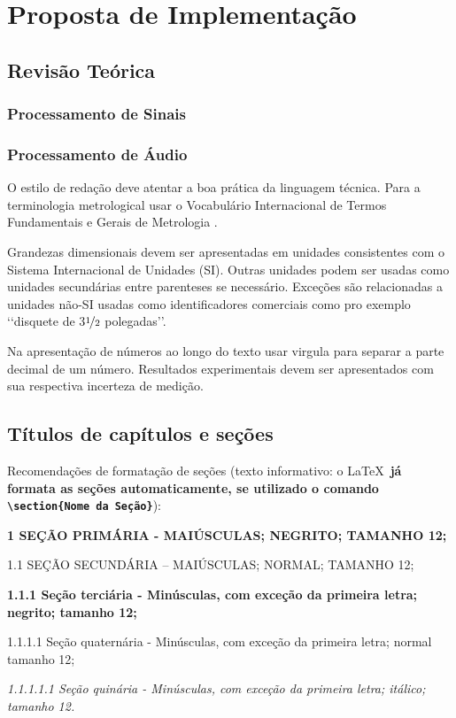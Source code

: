 \chapter[Proposta de Implementação]{Proposta de Implementação}

\section{Revisão Teórica}
\subsection{Processamento de Sinais}
\subsection{Processamento de Áudio}
O estilo de redação deve atentar a boa prática da linguagem técnica. Para a 
terminologia metrological usar o Vocabulário Internacional de Termos 
Fundamentais e Gerais de Metrologia \cite{inmetro2003}.

Grandezas dimensionais devem ser apresentadas em unidades consistentes com 
o Sistema Internacional de Unidades  (SI). Outras unidades podem ser usadas 
como unidades secundárias entre parenteses se necessário. Exceções são 
relacionadas a unidades não-SI usadas como identificadores comerciais como 
pro exemplo \lq\lq disquete de  3$\nicefrac{1}{2}$ polegadas\rq\rq. 

Na apresentação de números ao longo do texto usar virgula para separar a 
parte decimal de um número. Resultados experimentais devem ser apresentados 
com sua respectiva incerteza de medição.

\section{Títulos de capítulos e seções}

Recomendações de formatação de seções (texto informativo: o \LaTeX\
\textbf{já formata as seções automaticamente, se utilizado o comando
\texttt{\textbackslash section\{Nome da Seção\}}}):

\begin{description}

	\item \textbf{1 SEÇÃO PRIMÁRIA - MAIÚSCULAS; NEGRITO; TAMANHO 12;}

	\item 1.1 SEÇÃO SECUNDÁRIA – MAIÚSCULAS; NORMAL; TAMANHO 12; 

	\item \textbf{1.1.1 Seção terciária - Minúsculas, com exceção da 
	primeira letra; negrito; tamanho 12;}

	\item 1.1.1.1 Seção quaternária - Minúsculas, com exceção da primeira 
	letra; normal tamanho 12; 

 	\item \textit{1.1.1.1.1 Seção quinária - Minúsculas, com exceção da 
	primeira letra; itálico; tamanho 12.}

\end{description}

